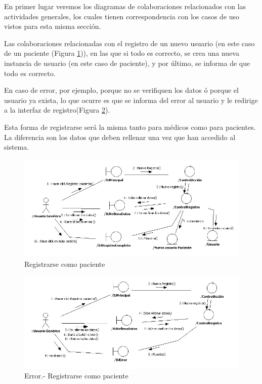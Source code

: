 		En primer lugar veremos los diagramas de colaboraciones relacionados con las actividades generales, los cuales tienen correspondencia con los casos de uso vistos para esta misma sección.
		
		Las colaboraciones relacionadas con el registro de un nuevo usuario (en este caso de un paciente (Figura \ref{fig:col_reg_paciente})), en las que si todo es correcto, se crea una nueva instancia de usuario (en este caso de paciente), y por último, se informa de que todo es correcto. 
		
		En caso de error, por ejemplo, porque no se verifiquen los datos ó porque el usuario ya exista, lo que ocurre es que se informa del error al usuario y le redirige a la interfaz de registro(Figura \ref{fig:col_reg_paciente_err}).
		
		Esta forma de registrarse será la misma tanto para médicos como para pacientes. La diferencia son los datos que deben rellenar una vez que han accedido al sistema.
		
		\bigskip
		\bigskip
		
		\begin{figure}[H]
		  \centering
		    \includegraphics[width=16cm]{img/jpg/colaboraciones/17_Registrarse_paciente.jpg}
		  \caption{Registrarse como paciente}
		  \label{fig:col_reg_paciente}
		\end{figure}
	
		\begin{figure}[H]
		  \centering
		    \includegraphics[width=16cm]{img/jpg/colaboraciones/18_RegistrarsePacienteError.jpg}
		  \caption{Error.- Registrarse como paciente}
		  \label{fig:col_reg_paciente_err}
		\end{figure}
		
